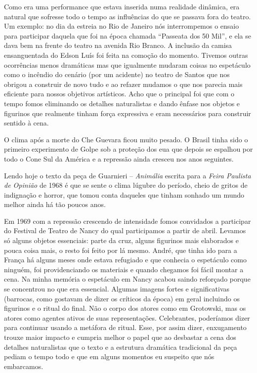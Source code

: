 Como era uma performance que estava inserida numa realidade dinâmica,
era natural que sofresse todo o tempo as influências do que se passava
fora do teatro. Um exemplo: no dia da estreia no Rio de Janeiro nós
interrompemos o ensaio para participar daquela que foi na época chamada
“Passeata dos 50 Mil”, e ela se dava bem na frente do teatro na avenida
Rio Branco. A inclusão da camisa ensanguentada do Edson Luís foi feita
na comoção do momento. Tivemos outras ocorrências menos dramáticas mas
que igualmente mudaram coisas no espetáculo como o incêndio do cenário
(por um acidente) no teatro de Santos que nos obrigou a construir de
novo tudo e ao refazer mudamos o que nos parecia mais eficiente para
nossos objetivos artísticos. Acho que o principal foi que com o tempo
fomos eliminando os detalhes naturalistas e dando ênfase nos objetos e
figurinos que realmente tinham força expressiva e eram necessários para
construir sentido à cena.

O clima após a morte do Che Guevara ficou muito pesado. O Brasil tinha
sido o primeiro experimento de Golpe sob a proteção dos {\sc eua} que depois
se espalhou por todo o Cone Sul da América e a repressão ainda cresceu
nos anos seguintes.

Lendo hoje o texto da peça de Guarnieri -- {\it Animália} escrita para a
{\it Feira Paulista de Opinião} de 1968 é que se sente o clima lúgubre
do período, cheio de gritos de indignação e horror, que tomou conta
daqueles que tinham sonhado um mundo melhor ainda há tão poucos anos.

Em 1969 com a repressão crescendo de intensidade fomos convidados a
participar do Festival de Teatro de Nancy do qual participamos a partir
de abril. Levamos só alguns objetos essenciais: parte da cruz, alguns
figurinos mais elaborados e pouca coisa mais, o resto foi feito por lá
mesmo. André, que tinha ido para a França há alguns meses onde estava
refugiado e que conhecia o espetáculo como ninguém, foi providenciando
os materiais e quando chegamos foi fácil montar a cena. Na minha memória
o espetáculo em Nancy acabou saindo reforçado porque se concentrou no
que era essencial. Algumas imagens fortes e significativas (barrocas,
como gostavam de dizer os críticos da época) em geral incluindo os
figurinos e o ritual do final. Não o corpo dos atores como em Grotowski,
mas os atores como agentes ativos de suas representações. Celebrantes,
poderíamos dizer para continuar usando a metáfora de ritual. Esse, por
assim dizer, enxugamento trouxe maior impacto e cumpria melhor o papel
que ao desbastar a cena dos detalhes naturalistas que o texto e a
estrutura dramática tradicional da peça pediam o tempo todo e que em
alguns momentos eu suspeito que nós embarcamos.


